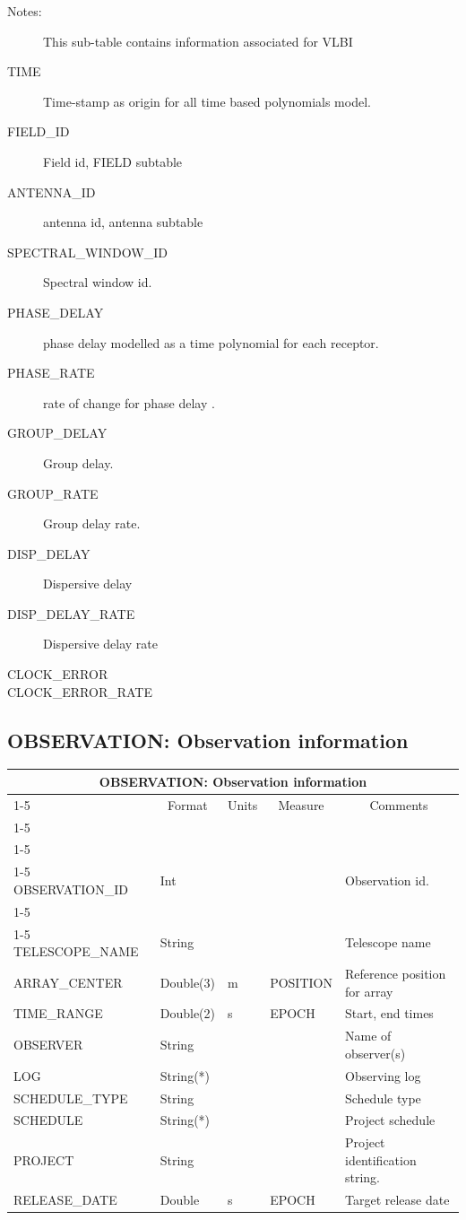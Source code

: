 \documentclass{article}
\newcommand{\defline}[1]{\cline{1-5}
\multicolumn{5}{|l|}{#1} \\
\cline{1-5}}
\newcommand{\definetable}[2]
{
	\vfill\newpage
	\subsection{#1}
        \vspace{0.15in}
        \small
	\begin{tabular}{|l|p{1.25in}|l|p{.9in}|p{1.4in}|}
	\hline
	\multicolumn{5}{|c|}{\bf #1}\\ 
	\cline{1-5}
        \multicolumn{1}{|c|}{Name}&\multicolumn{1}{|c|}{Format}&
        \multicolumn{1}{|c|}{Units}&\multicolumn{1}{|c|}{Measure}&
        \multicolumn{1}{|c|}{Comments}\\
        \cline{1-5}
        #2
        \hline
	\end{tabular}
}
\begin{document}
\begin{description}

\item[Notes:] This sub-table contains information associated for VLBI 

\item[TIME] Time-stamp as origin for all time based polynomials model.

\item[FIELD\_ID] Field id, FIELD subtable

\item[ANTENNA\_ID] antenna id, antenna subtable

\item[SPECTRAL\_WINDOW\_ID] Spectral window id.

\item[PHASE\_DELAY] phase delay modelled as a time polynomial for each receptor.

\item[PHASE\_RATE] rate of change for phase delay .

\item[GROUP\_DELAY] Group delay.

\item[GROUP\_RATE] Group delay rate.

\item[DISP\_DELAY] Dispersive delay

\item[DISP\_DELAY\_RATE] Dispersive delay rate
\item[CLOCK\_ERROR]
\item[CLOCK\_ERROR\_RATE]

\end{description}


\definetable{OBSERVATION: Observation information}{
\defline{\bf Columns}
\defline{\em Key}
OBSERVATION\_ID & Int & & & Observation id. \\
\defline{\em Data}  
TELESCOPE\_NAME &      String &    &      & Telescope name\\
ARRAY\_CENTER & Double(3)  & m & POSITION & Reference position for array \\
TIME\_RANGE       &     Double(2) & s & EPOCH & Start, end times\\
OBSERVER &       String &    &      & Name of observer(s)\\
LOG &   String(*) & & & Observing log \\
SCHEDULE\_TYPE &  String & & & Schedule type\\
SCHEDULE &       String(*) &    &      & Project schedule\\
PROJECT &               String &    &      & Project identification string.\\
RELEASE\_DATE &         Double &  s  & EPOCH & Target release date\\
}
\end{document}
